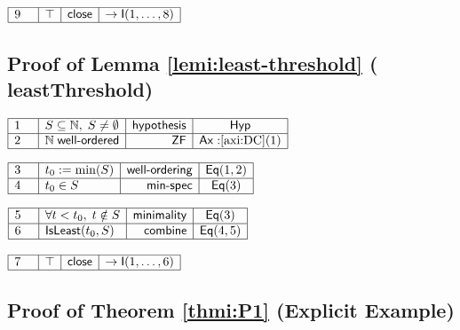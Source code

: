\documentclass[11pt,reqno]{amsart}
\providecommand{\N}{\mathbb{N}}
\begin{document}
\nointerlineskip\noindent$%
\begin{array}{|m{0.5cm}|l|r|c|}
\hline
9 & \top & \mathsf{close} & \to\mathsf{I}(1,\dots,8) \\ \hline
\end{array}%
$

\medskip


\subsection*{Proof of Lemma \protect\ref{lemi:least-threshold} (\textsf{%
leastThreshold})}

\noindent$%
\begin{array}{|m{0.5cm}|l|r|c|}
\hline
1 & S\subseteq\N,\;S\ne\emptyset & \mathsf{hypothesis} & \mathsf{Hyp} \\ 
\hline
2 & \N\;\mathsf{well\text{-}ordered} & \mathsf{ZF} & \mathsf{Ax:}\ref{axi:DC}%
(1) \\ \hline
\end{array}%
$

\nointerlineskip\noindent$%
\begin{array}{|m{0.5cm}|l|r|c|}
\hline
3 & t_{0}:=\min(S) & \mathsf{well\text{-}ordering} & \mathsf{Eq}(1,2) \\ 
\hline
4 & t_{0}\in S & \mathsf{min\text{-}spec} & \mathsf{Eq}(3) \\ \hline
\end{array}%
$

\nointerlineskip\noindent$%
\begin{array}{|m{0.5cm}|l|r|c|}
\hline
5 & \forall t<t_{0},\;t\notin S & \mathsf{minimality} & \mathsf{Eq}(3) \\ 
\hline
6 & \mathsf{IsLeast}(t_{0},S) & \mathsf{combine} & \mathsf{Eq}(4,5) \\ \hline
\end{array}%
$

\nointerlineskip\noindent$%
\begin{array}{|m{0.5cm}|l|r|c|}
\hline
7 & \top & \mathsf{close} & \to\mathsf{I}(1,\dots,6) \\ \hline
\end{array}%
$

\medskip


\subsection*{Proof of Theorem \protect\ref{thmi:P1} (Explicit Example)}
\end{document}
